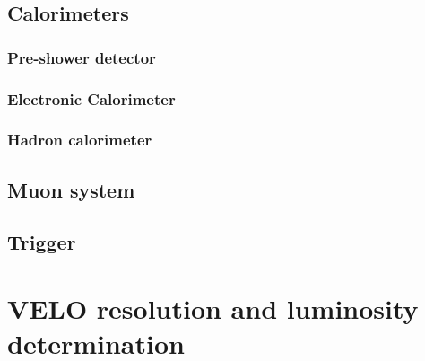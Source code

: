 \subsection{Calorimeters}
\subsubsection{Pre-shower detector}
\subsubsection{Electronic Calorimeter}
\subsubsection{Hadron calorimeter}
\subsection{Muon system}
\subsection{Trigger}
\subsubsection{\lone}
\subsubsection{\hltone}
\subsubsection{\hlttwo}


\section{VELO resolution and luminosity determination}